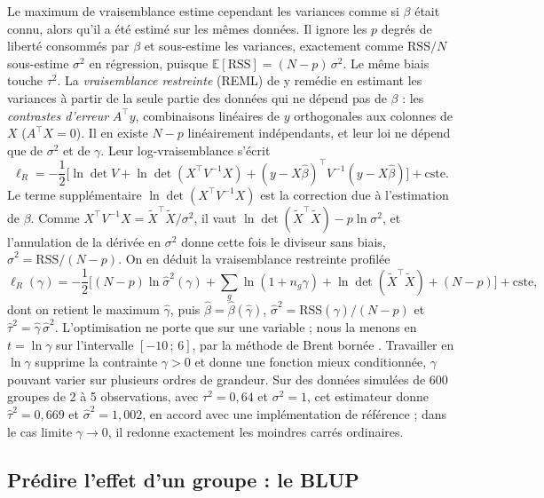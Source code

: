 \documentclass[11pt,a4paper]{article}
\newcommand{\E}{\mathbb{E}}
\begin{document}
Le maximum de vraisemblance estime cependant les variances comme si $\beta$ était connu, alors qu'il a été estimé sur
les mêmes données. Il ignore les $p$ degrés de liberté consommés par $\beta$ et sous-estime les variances, exactement
comme $\mathrm{RSS}/N$ sous-estime $\sigma^2$ en régression, puisque $\E[\mathrm{RSS}] = (N - p)\,\sigma^2$. Le
même biais touche $\tau^2$. La \emph{vraisemblance restreinte} (REML) de \citet{patterson1971} y remédie en estimant
les variances à partir de la seule partie des données qui ne dépend pas de $\beta$ : les \emph{contrastes d'erreur}
$A^\top y$, combinaisons linéaires de $y$ orthogonales aux colonnes de $X$ ($A^\top X = 0$). Il en existe $N - p$
linéairement indépendants, et leur loi ne dépend que de $\sigma^2$ et de $\gamma$. Leur log-vraisemblance s'écrit
\[
\ell_R = -\frac12\Big[\ln\det V + \ln\det(X^\top V^{-1}X) + (y - X\hat\beta)^\top V^{-1}(y - X\hat\beta)\Big] + \text{cste}.
\]
Le terme supplémentaire $\ln\det(X^\top V^{-1}X)$ est la correction due à l'estimation de $\beta$. Comme
$X^\top V^{-1}X = \tilde X^\top\tilde X/\sigma^2$, il vaut $\ln\det(\tilde X^\top\tilde X) - p\ln\sigma^2$, et
l'annulation de la dérivée en $\sigma^2$ donne cette fois le diviseur sans biais, $\hat\sigma^2 = \mathrm{RSS}/(N-p)$.
On en déduit la vraisemblance restreinte profilée
\begin{equation}\label{eq:reml}
\ell_R(\gamma) = -\frac12\Big[(N - p)\ln\hat\sigma^2(\gamma) + \sum_g\ln(1 + n_g\gamma)
+ \ln\det(\tilde X^\top\tilde X) + (N - p)\Big] + \text{cste},
\end{equation}
dont on retient le maximum $\hat\gamma$, puis $\hat\beta = \hat\beta(\hat\gamma)$,
$\hat\sigma^2 = \mathrm{RSS}(\hat\gamma)/(N - p)$ et $\hat\tau^2 = \hat\gamma\,\hat\sigma^2$. L'optimisation ne porte
que sur une variable ; nous la menons en $t = \ln\gamma$ sur l'intervalle $[-10\,;\,6]$, par la méthode de Brent
bornée \citep{brent1973}. Travailler en $\ln\gamma$ supprime la contrainte $\gamma > 0$ et donne une fonction mieux conditionnée,
$\gamma$ pouvant varier sur plusieurs ordres de grandeur. Sur des données simulées de 600 groupes de 2 à 5
observations, avec $\tau^2 = 0{,}64$ et $\sigma^2 = 1$, cet estimateur donne $\hat\tau^2 = 0{,}669$ et
$\hat\sigma^2 = 1{,}002$, en accord avec une implémentation de référence ; dans le cas limite $\gamma \to 0$, il
redonne exactement les moindres carrés ordinaires.

\subsection{Prédire l'effet d'un groupe : le BLUP}\label{sec:blup}
\end{document}
